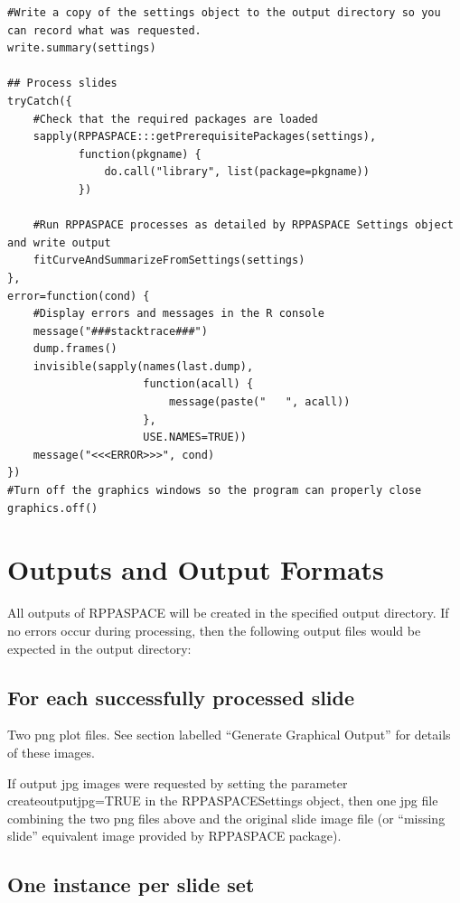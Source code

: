 \documentclass[
]{article}
\begin{document}
\begin{verbatim}
#Write a copy of the settings object to the output directory so you can record what was requested.
write.summary(settings)

## Process slides
tryCatch({
    #Check that the required packages are loaded
    sapply(RPPASPACE:::getPrerequisitePackages(settings),
           function(pkgname) {
               do.call("library", list(package=pkgname))
           })
    
    #Run RPPASPACE processes as detailed by RPPASPACE Settings object and write output
    fitCurveAndSummarizeFromSettings(settings)
},
error=function(cond) {
    #Display errors and messages in the R console
    message("###stacktrace###")
    dump.frames()
    invisible(sapply(names(last.dump),
                     function(acall) {
                         message(paste("   ", acall))
                     },
                     USE.NAMES=TRUE))
    message("<<<ERROR>>>", cond)
})
#Turn off the graphics windows so the program can properly close
graphics.off()
\end{verbatim}

\hypertarget{outputs}{%
\section{Outputs and Output Formats}\label{outputs}}

All outputs of RPPASPACE will be created in the specified output
directory. If no errors occur during processing, then the following
output files would be expected in the output directory:

\hypertarget{for-each-successfully-processed-slide}{%
\subsection{For each successfully processed
slide}\label{for-each-successfully-processed-slide}}

Two png plot files. See section labelled ``Generate Graphical Output''
for details of these images.

If output jpg images were requested by setting the parameter
createoutputjpg=TRUE in the RPPASPACESettings object, then one jpg file
combining the two png files above and the original slide image file (or
``missing slide'' equivalent image provided by RPPASPACE package).

\hypertarget{one-instance-per-slide-set}{%
\subsection{One instance per slide
set}\label{one-instance-per-slide-set}}
\end{document}
